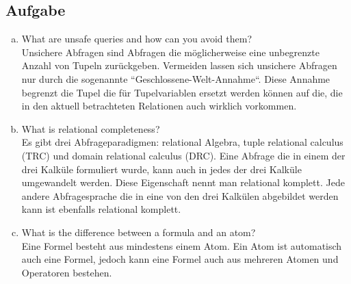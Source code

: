 \documentclass[11pt,a4paper,DIV=9]{scrartcl}
\newcounter{temp}
\newcommand{\aufgabe}[1]{
  \setcounter{temp}{\value{subsection}}
  \setcounter{subsection}{#1}
  \addtocounter{subsection}{-1}
  \subsection{Aufgabe}
  \setcounter{subsection}{\value{temp}}
}
\begin{document}
\aufgabe{3}
\begin{enumerate}[a)]
 \item What are unsafe queries and how can you avoid them? \\
 Unsichere Abfragen sind Abfragen die m\"oglicherweise eine unbegrenzte Anzahl von Tupeln zur\"uckgeben. Vermeiden lassen sich unsichere Abfragen nur durch die sogenannte ``Geschlossene-Welt-Annahme``. Diese Annahme begrenzt die Tupel die f\"ur Tupelvariablen ersetzt werden k\"onnen auf die, die in den aktuell betrachteten Relationen auch wirklich vorkommen.
 \item What is relational completeness? \\
 Es gibt drei Abfrageparadigmen: relational Algebra, tuple relational calculus (TRC) und domain relational calculus (DRC). Eine Abfrage die in einem der drei Kalk\"ule formuliert wurde, kann auch in jedes der drei Kalk\"ule umgewandelt werden. Diese Eigenschaft nennt man relational komplett. Jede andere Abfragesprache die in eine von den drei Kalk\"ulen abgebildet werden kann ist ebenfalls relational komplett.
 \item What is the difference between a formula and an atom? \\
 Eine Formel besteht aus mindestens einem Atom. Ein Atom ist automatisch auch eine Formel, jedoch kann eine Formel auch aus mehreren Atomen und Operatoren bestehen.
\end{enumerate}
\end{document}

